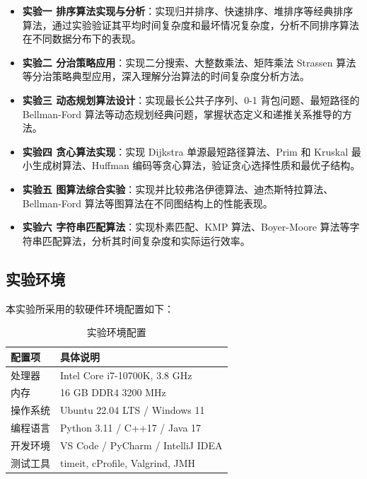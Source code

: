 \documentclass[12pt,a4paper,UTF8]{article}
\begin{document}
\begin{itemize}
    \item \textbf{实验一 排序算法实现与分析}：实现归并排序、快速排序、堆排序等经典排序算法，通过实验验证其平均时间复杂度和最坏情况复杂度，分析不同排序算法在不同数据分布下的表现。

    \item \textbf{实验二 分治策略应用}：实现二分搜索、大整数乘法、矩阵乘法 Strassen 算法等分治策略典型应用，深入理解分治算法的时间复杂度分析方法。

    \item \textbf{实验三 动态规划算法设计}：实现最长公共子序列、0-1 背包问题、最短路径的 Bellman-Ford 算法等动态规划经典问题，掌握状态定义和递推关系推导的方法。

    \item \textbf{实验四 贪心算法实现}：实现 Dijkstra 单源最短路径算法、Prim 和 Kruskal 最小生成树算法、Huffman 编码等贪心算法，验证贪心选择性质和最优子结构。

    \item \textbf{实验五 图算法综合实验}：实现并比较弗洛伊德算法、迪杰斯特拉算法、Bellman-Ford 算法等图算法在不同图结构上的性能表现。

    \item \textbf{实验六 字符串匹配算法}：实现朴素匹配、KMP 算法、Boyer-Moore 算法等字符串匹配算法，分析其时间复杂度和实际运行效率。
\end{itemize}

\subsection{实验环境}

本实验所采用的软硬件环境配置如下：

\begin{table}[H]
    \centering
    \caption{实验环境配置}
    \begin{tabular}{p{3cm}p{8cm}}
        \toprule
        \textbf{配置项} & \textbf{具体说明} \\
        \midrule
        处理器 & Intel Core i7-10700K, 3.8 GHz \\
        内存 & 16 GB DDR4 3200 MHz \\
        操作系统 & Ubuntu 22.04 LTS / Windows 11 \\
        编程语言 & Python 3.11 / C++17 / Java 17 \\
        开发环境 & VS Code / PyCharm / IntelliJ IDEA \\
        测试工具 & timeit, cProfile, Valgrind, JMH \\
        \bottomrule
    \end{tabular}
\end{table}
\end{document}
